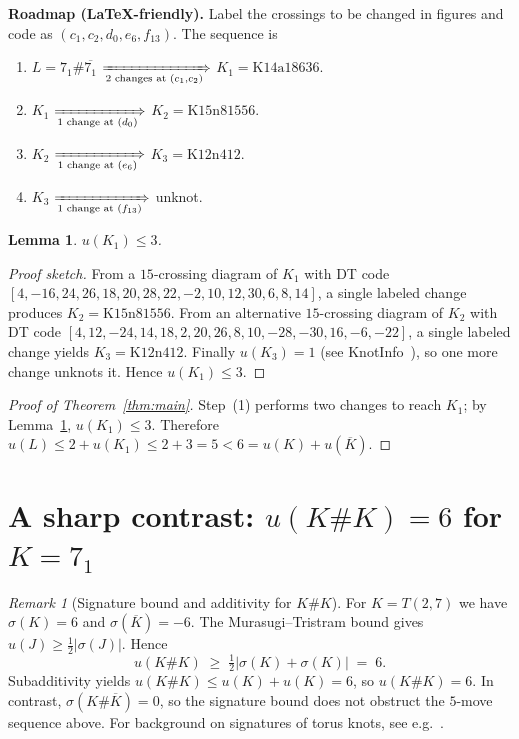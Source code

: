 \documentclass[11pt]{article}
\theoremstyle{plain}
\newtheorem{lemma}{Lemma}
\theoremstyle{remark}
\newtheorem{remark}{Remark}
\newcommand{\Kone}{K_1}
\newcommand{\Ktwo}{K_2}
\newcommand{\Kthree}{K_3}
\begin{document}
\medskip
\noindent\textbf{Roadmap (LaTeX-friendly).} Label the crossings to be changed in figures and code as \((c_1,c_2,d_0,e_6,f_{13})\). The sequence is
\begin{enumerate}[label=\textbf{(\arabic*)}, leftmargin=2.2em]
  \item \(L=7_1\#\overline{7_1}\)\; \(\xRightarrow[\text{2 changes at }(c_1,c_2)]{}\)\; \(\Kone=\text{K14a18636}\).
  \item \(\Kone\)\; \(\xRightarrow[\text{1 change at }(d_0)]{}\)\; \(\Ktwo=\text{K15n81556}\).
  \item \(\Ktwo\)\; \(\xRightarrow[\text{1 change at }(e_6)]{}\)\; \(\Kthree=\text{K12n412}\).
  \item \(\Kthree\)\; \(\xRightarrow[\text{1 change at }(f_{13})]{}\)\; \(\)unknot.
\end{enumerate}

\begin{lemma}\label{lem:K1le3}
\(u(\Kone)\le 3\).
\end{lemma}

\begin{proof}[Proof sketch]
From a \(15\)-crossing diagram of \(\Kone\) with DT code \([4,-16,24,26,18,20,28,22,-2,10,12,30,6,8,14]\), a single labeled change produces \(\Ktwo=\text{K15n81556}\).
From an alternative \(15\)-crossing diagram of \(\Ktwo\) with DT code \([4,12,-24,14,18,2,20,26,8,10,-28,-30,16,-6,-22]\), a single labeled change yields \(\Kthree=\text{K12n412}\).
Finally \(u(\Kthree)=1\) (see KnotInfo~\cite{KnotInfo}), so one more change unknots it. Hence \(u(\Kone)\le 3\).
\end{proof}

\begin{proof}[Proof of Theorem~\ref{thm:main}]
Step~(1) performs two changes to reach \(\Kone\); by Lemma~\ref{lem:K1le3}, \(u(\Kone)\le3\). Therefore
\(
u(L)\le 2+u(\Kone)\le 2+3=5<6=u(K)+u(\overline K).
\)
\end{proof}

\section{A sharp contrast: \(u(K\#K)=6\) for \(K=7_1\)}
\begin{remark}[Signature bound and additivity for \(K\#K\)]
For \(K=T(2,7)\) we have \(\sigma(K)=6\) and \(\sigma(\overline K)=-6\).
The Murasugi--Tristram bound gives \(u(J)\ge \tfrac12|\sigma(J)|\). Hence
\[
u(K\#K)\;\ge\;\tfrac12|\sigma(K)+\sigma(K)|\;=\;6.
\]
Subadditivity yields \(u(K\#K)\le u(K)+u(K)=6\), so \(u(K\#K)=6\).
In contrast, \(\sigma(K\#\overline K)=0\), so the signature bound does not obstruct the \(5\)-move sequence above.
For background on signatures of torus knots, see e.g.~\cite{Borodzik2010}.
\end{remark}
\end{document}
